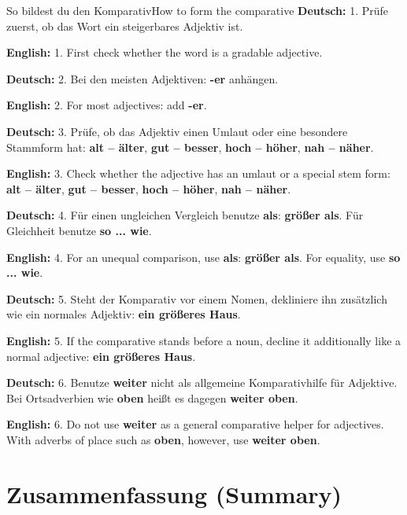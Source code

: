 \documentclass[a4paper,11pt]{article}
\newcommand{\GermanText}[1]{\textbf{Deutsch: }#1\par}
\newcommand{\EnglishText}[1]{{\small\color{SoftGray}\textbf{English: }#1\par}}
\begin{document}
\begin{grammarentry}{So bildest du den Komparativ}{How to form the comparative}
\GermanText{1. Prüfe zuerst, ob das Wort ein steigerbares Adjektiv ist.}
\EnglishText{1. First check whether the word is a gradable adjective.}

\GermanText{2. Bei den meisten Adjektiven: \textbf{-er} anhängen.}
\EnglishText{2. For most adjectives: add \textbf{-er}.}

\GermanText{3. Prüfe, ob das Adjektiv einen Umlaut oder eine besondere Stammform hat: \textbf{alt -- älter}, \textbf{gut -- besser}, \textbf{hoch -- höher}, \textbf{nah -- näher}.}
\EnglishText{3. Check whether the adjective has an umlaut or a special stem form: \textbf{alt -- älter}, \textbf{gut -- besser}, \textbf{hoch -- höher}, \textbf{nah -- näher}.}

\GermanText{4. Für einen ungleichen Vergleich benutze \textbf{als}: \textbf{größer als}. Für Gleichheit benutze \textbf{so ... wie}.}
\EnglishText{4. For an unequal comparison, use \textbf{als}: \textbf{größer als}. For equality, use \textbf{so ... wie}.}

\GermanText{5. Steht der Komparativ vor einem Nomen, dekliniere ihn zusätzlich wie ein normales Adjektiv: \textbf{ein größeres Haus}.}
\EnglishText{5. If the comparative stands before a noun, decline it additionally like a normal adjective: \textbf{ein größeres Haus}.}

\GermanText{6. Benutze \textbf{weiter} nicht als allgemeine Komparativhilfe für Adjektive. Bei Ortsadverbien wie \textbf{oben} heißt es dagegen \textbf{weiter oben}.}
\EnglishText{6. Do not use \textbf{weiter} as a general comparative helper for adjectives. With adverbs of place such as \textbf{oben}, however, use \textbf{weiter oben}.}
\end{grammarentry}

\section{Zusammenfassung \textnormal{(Summary)}}
\end{document}
